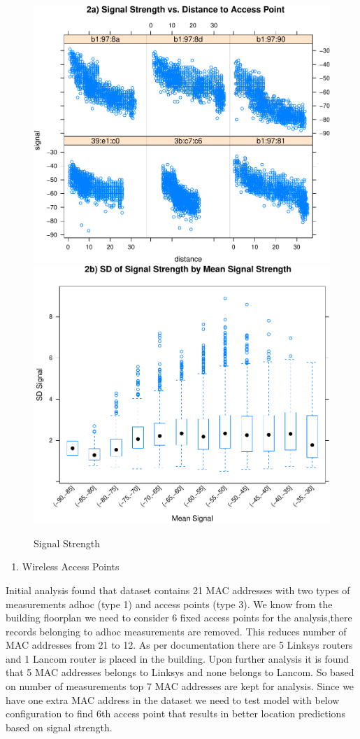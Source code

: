 \documentclass[
]{article}
\providecommand{\tightlist}{%
  \setlength{\itemsep}{0pt}\setlength{\parskip}{0pt}}
\begin{document}
\begin{figure}[H]

\includegraphics[width=.49\linewidth,]{msds7333_case_study01_files/figure-latex/unnamed-chunk-7-1} \includegraphics[width=.49\linewidth,]{msds7333_case_study01_files/figure-latex/unnamed-chunk-7-2} \hfill{}

\caption{Signal Strength}\label{fig:unnamed-chunk-7}
\end{figure}

\begin{enumerate}
\def\labelenumi{\arabic{enumi}.}
\setcounter{enumi}{1}
\tightlist
\item
  Wireless Access Points
\end{enumerate}

Initial analysis found that dataset contains 21 MAC addresses with two
types of measurements adhoc (type 1) and access points (type 3). We know
from the building floorplan we need to consider 6 fixed access points
for the analysis,there records belonging to adhoc measurements are
removed. This reduces number of MAC addresses from 21 to 12. As per
documentation there are 5 Linksys routers and 1 Lancom router is placed
in the building. Upon further analysis it is found that 5 MAC addresses
belongs to Linksys and none belongs to Lancom. So based on number of
measurements top 7 MAC addresses are kept for analysis. Since we have
one extra MAC address in the dataset we need to test model with below
configuration to find 6th access point that results in better location
predictions based on signal strength.
\end{document}
